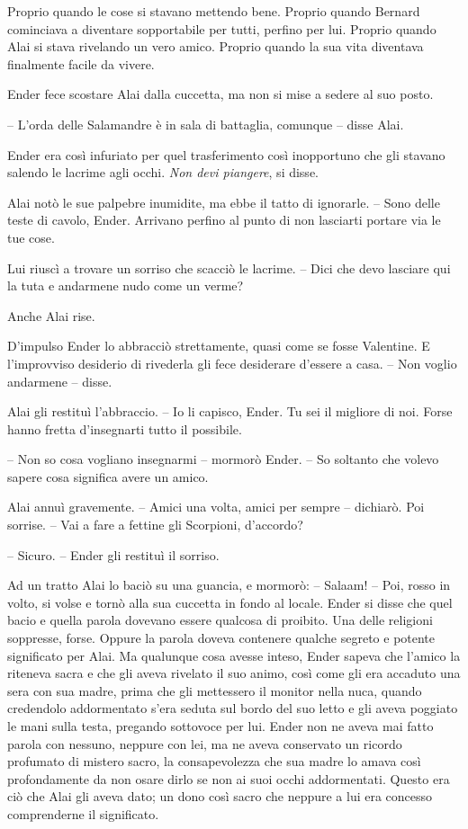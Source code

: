 {Proprio quando le cose si stavano mettendo bene. Proprio quando Bernard
	cominciava a diventare sopportabile per tutti, perfino per lui. Proprio
	quando Alai si stava rivelando un vero amico. Proprio quando la sua vita
	diventava finalmente facile da vivere.}

{Ender fece scostare Alai dalla cuccetta, ma non si mise a sedere al suo
	posto.}

{-- L'orda delle Salamandre è in sala di battaglia, comunque -- disse
	Alai.}

{Ender era così infuriato per quel trasferimento così inopportuno che
	gli stavano salendo le lacrime agli occhi. \emph{Non devi piangere},
	\emph{} si disse.}

{Alai notò le sue palpebre inumidite, ma ebbe il tatto di ignorarle. --
	Sono delle teste di cavolo, Ender. Arrivano perfino al punto di non
	lasciarti portare via le tue cose.}

{Lui riuscì a trovare un sorriso che scacciò le lacrime. -- Dici che
	devo lasciare qui la tuta e andarmene nudo come un verme?}

{Anche Alai rise.}

{D'impulso Ender lo abbracciò strettamente, quasi come se fosse
	Valentine. E l'improvviso desiderio di rivederla gli fece desiderare
	d'essere a casa. -- Non voglio andarmene -- disse.}

{Alai gli restituì l'abbraccio. -- Io li capisco, Ender. Tu sei il
	migliore di noi. Forse hanno fretta d'insegnarti tutto il possibile.}

{-- Non so cosa vogliano insegnarmi -- mormorò Ender. -- So soltanto che
	volevo sapere cosa significa avere un amico.}

{Alai annuì gravemente. -- Amici una volta, amici per sempre --
	dichiarò. Poi sorrise. -- Vai a fare a fettine gli Scorpioni,
	d'accordo?}

{-- Sicuro. -- Ender gli restituì il sorriso.}

{Ad un tratto Alai lo baciò su una guancia, e mormorò: -- Salaam! --
	Poi, rosso in volto, si volse e tornò alla sua cuccetta in fondo al
	locale. Ender si disse che quel bacio e quella parola dovevano essere
	qualcosa di proibito. Una delle religioni soppresse, forse. Oppure la
	parola doveva contenere qualche segreto e potente significato per Alai.
	Ma qualunque cosa avesse inteso, Ender sapeva che l'amico la riteneva
	sacra e che gli aveva rivelato il suo animo, così come gli era accaduto
	una sera con sua madre, prima che gli mettessero il monitor nella nuca,
	quando credendolo addormentato s'era seduta sul bordo del suo letto e
	gli aveva poggiato le mani sulla testa, pregando sottovoce per lui.
	Ender non ne aveva mai fatto parola con nessuno, neppure con lei, ma ne
	aveva conservato un ricordo profumato di mistero sacro, la
	consapevolezza che sua madre lo amava così profondamente da non osare
	dirlo se non ai suoi occhi addormentati. Questo era ciò che Alai gli
	aveva dato; un dono così sacro che neppure a lui era concesso
	comprenderne il significato.}

